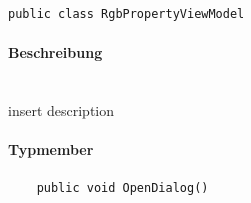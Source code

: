 \begin{verbatim}
public class RgbPropertyViewModel
\end{verbatim}

\paragraph{Beschreibung}~\\
insert description

\paragraph{Typmember}
\begin{itemize}
	
	\begin{verbatim}
	public void OpenDialog()
	\end{verbatim}

\end{itemize}


